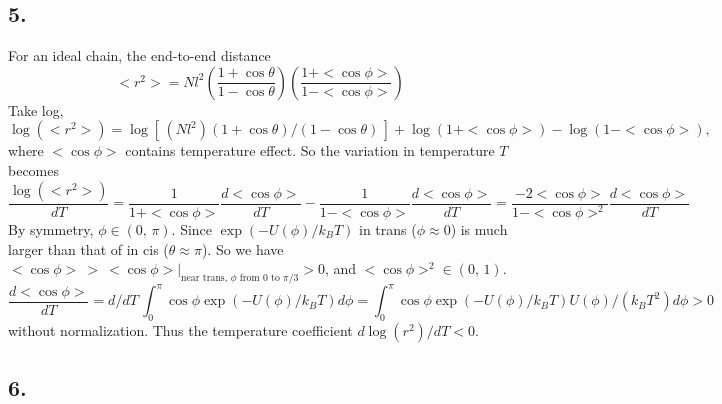 \documentclass[a4paper]{article}
\begin{document}
\subsection*{5.}
For an ideal chain, the end-to-end distance
\[
    <r^2> = N l^2 \left( \frac{1+\cos \theta}{1-\cos \theta} \right) \left(\frac{1+<\cos \phi>}{1-<\cos \phi> }\right)
\]
Take log,
\[
    \log(<r^2>) = \log[\, (N l^2)(1+\cos \theta)/(1-\cos \theta)\,]
        + \log(1+<\cos\phi>) - \log (1-<\cos\phi>),
\]
where $<\cos\phi>$ contains temperature effect.
So the variation in temperature $T$ becomes
\[
\frac{ \log(<r^2>)}{dT} = \frac{1}{1+<\cos \phi>} \frac{d <\cos \phi>}{d T} - \frac{1}{1-<\cos \phi>}\frac{d <\cos \phi>}{d T}
= \frac{-2<\cos\phi>}{1-<\cos\phi>^2} \frac{d<\cos \phi>}{dT}
\]
By symmetry, $\phi \in (0,\,\pi)$. Since $\exp(-U(\phi)/k_BT)$ in trans ($\phi \approx 0$) is much larger than that of in cis ($\theta \approx \pi$). So we have $<\cos \phi> \: > \: <\cos \phi>|_{\text{near trans, $\phi$ from $0$ to $\pi/3$} } > 0$, and $<\cos\phi>^2 \in (0,\,1)$.
\[
    \frac{d<\cos \phi>}{dT} = d/dT \,\int_0^{\pi} \cos\phi \exp(-U(\phi)/k_BT) d\phi = \int_0^{\pi} \cos\phi \exp(-U(\phi)/k_BT) U(\phi) /(k_BT^2) d\phi > 0 
\]
without normalization. Thus the temperature coefficient $d\log(r^2)/dT < 0$.



\subsection*{6.}
    
\end{document}
